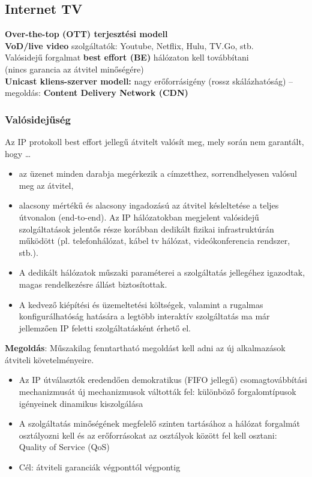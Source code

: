 \documentclass[10pt,a4paper]{article}
\begin{document}
\subsection{Internet TV}
\textbf{Over-the-top (OTT) terjesztési modell}\\
\textbf{VoD/live video} szolgáltatók: Youtube, Netflix, Hulu, TV.Go, stb.\\
Valósidejű forgalmat \textbf{best effort (BE)} hálózaton kell továbbítani\\
(nincs garancia az átvitel minőségére)\\
\textbf{Unicast kliens-szerver modell:} nagy erőforrásigény (rossz
skálázhatóság) – megoldás: \textbf{Content Delivery Network (CDN)}
\subsubsection{Valósidejűség}
Az IP protokoll best effort jellegű átvitelt valósít meg,
mely során nem garantált, hogy …
\begin{itemize}
	\item az üzenet minden darabja megérkezik a címzetthez,
	 sorrendhelyesen valósul meg az átvitel,
	\item alacsony mértékű és alacsony ingadozású az átvitel
	késleltetése a teljes útvonalon (end-to-end).
	Az IP hálózatokban megjelent valósidejű
	szolgáltatások jelentős része korábban dedikált
	fizikai infrastruktúrán működött (pl. telefonhálózat,
	kábel tv hálózat, videókonferencia rendszer, stb.).
	\item A dedikált hálózatok műszaki paraméterei a
	szolgáltatás jellegéhez igazodtak, magas
	rendelkezésre állást biztosítottak.
	\item A kedvező kiépítési és üzemeltetési költségek,
	valamint a rugalmas konfigurálhatóság hatására a
	legtöbb interaktív szolgáltatás ma már jellemzően IP
	feletti szolgáltatásként érhető el.
\end{itemize}
\textbf{Megoldás}: Műszakilag fenntartható megoldást kell adni az új
alkalmazások átviteli követelményeire.
\begin{itemize}
	\item Az IP útválasztók eredendően demokratikus (FIFO
	jellegű) csomagtovábbítási mechanizmusát új
	mechanizmusok váltották fel: különböző
	forgalomtípusok igényeinek dinamikus kiszolgálása
	\item A szolgáltatás minőségének megfelelő szinten
	tartásához a hálózat forgalmát osztályozni kell és az
	erőforrásokat az osztályok között fel kell osztani:
	Quality of Service (QoS)
	\item Cél: átviteli garanciák végponttól végpontig
\end{itemize}
\end{document}
